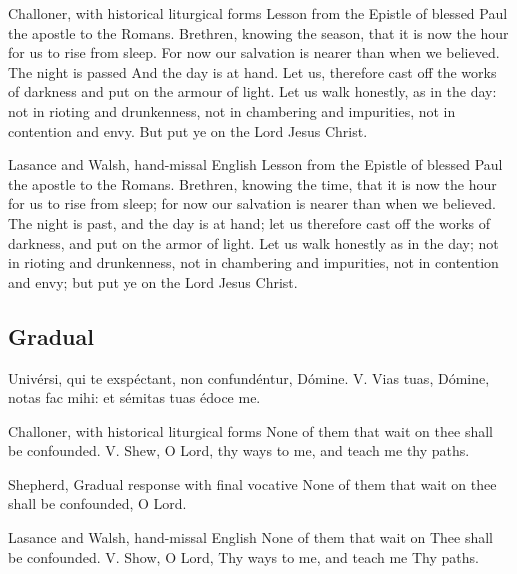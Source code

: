\begin{englishwitness}{Challoner, with historical liturgical forms}
Lesson from the Epistle of blessed Paul the apostle to the Romans. Brethren, knowing the season, that it is now the hour for us to rise from sleep. For now our salvation is nearer than when we believed. The night is passed And the day is at hand. Let us, therefore cast off the works of darkness and put on the armour of light. Let us walk honestly, as in the day: not in rioting and drunkenness, not in chambering and impurities, not in contention and envy. But put ye on the Lord Jesus Christ.
\end{englishwitness}

\begin{englishwitness}{Lasance and Walsh, hand-missal English}
Lesson from the Epistle of blessed Paul the apostle to the Romans. Brethren, knowing the time, that it is now the hour for us to rise from sleep; for now our salvation is nearer than when we believed. The night is past, and the day is at hand; let us therefore cast off the works of darkness, and put on the armor of light. Let us walk honestly as in the day; not in rioting and drunkenness, not in chambering and impurities, not in contention and envy; but put ye on the Lord Jesus Christ.
\end{englishwitness}

\subsection{Gradual}
\label{proper-gradual}

\begin{latinproper}
Univérsi, qui te exspéctant, non confundéntur, Dómine. V. Vias tuas, Dómine, notas fac mihi: et sémitas tuas édoce me.
\end{latinproper}

\begin{englishwitness}{Challoner, with historical liturgical forms}
None of them that wait on thee shall be confounded. V. Shew, O Lord, thy ways to me, and teach me thy paths.
\end{englishwitness}

\begin{englishwitness}{Shepherd, Gradual response with final vocative}
None of them that wait on thee shall be confounded, O Lord.
\end{englishwitness}

\begin{englishwitness}{Lasance and Walsh, hand-missal English}
None of them that wait on Thee shall be confounded. V. Show, O Lord, Thy ways to me, and teach me Thy paths.
\end{englishwitness}

